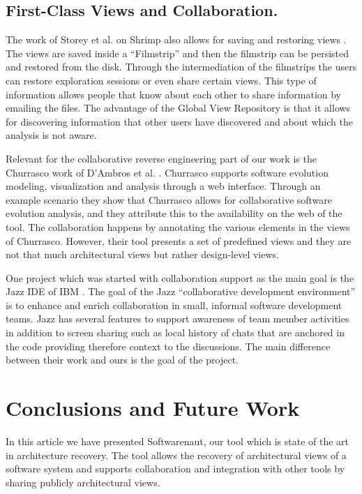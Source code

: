 \documentclass[preprint,12pt]{elsarticle}
\begin{document}
\subsection {First-Class Views and Collaboration.} The work of Storey et al. on Shrimp also allows for saving and restoring views \cite{rayside-flow}. The views are saved inside a “Filmstrip” and then the filmstrip can be persisted and restored from the disk. Through the intermediation of the filmstrips the users can restore exploration sessions or even share certain views. This type of information allows people that know about each other to share information by emailing the files. The advantage of the Global View Repository is that it allows for discovering information that other users have discovered and about which the analysis is not aware. 


Relevant for the collaborative reverse engineering part of our work is the Churrasco work of D’Ambros et al. \cite{dambros-churrasco}. Churrasco supports software evolution modeling, visualization and analysis through a web interface. 
Through an example scenario they show that Churrasco allows for collaborative software evolution analysis, and they attribute this to the availability on the web of the tool. The collaboration happens by annotating the various elements in the views of Churrasco. However, their tool presents a set of predefined views and they are not that much architectural views but rather design-level views. 

One project which was started with collaboration support as the main goal is the Jazz IDE of IBM \cite{hupfer-jazz}. The goal of the Jazz ``collaborative development environment'' is to enhance and enrich collaboration in small, informal software development teams. Jazz has several features to support awareness of team member activities in addition to screen sharing such as local history of chats that are anchored in the code providing therefore context to the discussions. The main difference between their work and ours is the goal of the project.





\newpage
\section {Conclusions and Future Work}
\label {sec:conc}

In this article we have presented Softwarenaut, our tool which is state of the art in architecture recovery. The tool allows the recovery of architectural views of a software system and supports collaboration and integration with other tools by sharing publicly architectural views.
\end{document}
